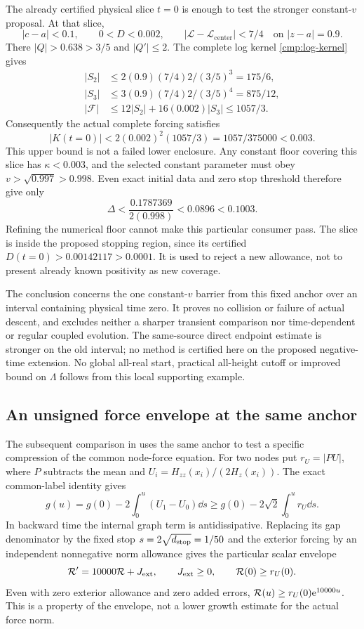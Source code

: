 The already certified physical slice $t=0$ is enough to test the stronger
constant-$v$ proposal. At that slice,
\[
 |c-a|<0.1,\qquad 0<D<0.002,\qquad
 |\mathcal L-\mathcal L_{\mathrm{center}}|<7/4
 \quad\text{on }|z-a|=0.9.
\]
There $|Q|>0.638>3/5$ and $|Q'|\le2$. The complete log kernel
\eqref{cmp:log-kernel} gives
\begin{align*}
 |S_2|&\le 2(0.9)(7/4)2/(3/5)^3=175/6,\\
 |S_3|&\le 3(0.9)(7/4)2/(3/5)^4=875/12,\\
 |\mathcal F|&\le12|S_2|+16(0.002)|S_3|\le1057/3.
\end{align*}
Consequently the actual complete forcing satisfies
\begin{equation}
 |K(t=0)|<2(0.002)^2(1057/3)
        =1057/375000<0.003.
 \label{supp:small-K}
\end{equation}
This upper bound is not a failed lower enclosure. Any constant floor
covering this slice has $\kappa<0.003$, and the selected constant
parameter must obey $v>\sqrt{0.997}>0.998$. Even exact initial data and
zero stop threshold therefore give only
\[
 \Delta<\frac{0.1787369}{2(0.998)}<0.0896<0.1003.
\]
Refining the numerical floor cannot make this particular consumer pass.
The slice is inside the proposed stopping region, since its certified
$D(t=0)>0.00142117>0.0001$. It is used to reject a new allowance, not to
present already known positivity as new coverage.

The conclusion concerns the one constant-$v$ barrier from this fixed
anchor over an interval containing physical time zero. It proves no
collision or failure of actual descent, and excludes neither a sharper
transient comparison nor time-dependent or regular coupled evolution.
The same-source direct endpoint estimate is stronger on the old interval;
no method is certified here on the proposed negative-time extension.
No global all-real start, practical all-height cutoff or improved bound
on $\Lambda$ follows from this local supporting example.

\subsection{An unsigned force envelope at the same anchor}
\label{supp:force-envelope}

The subsequent comparison in \cite{BakerCM32,BakerCMReview29} uses
the same anchor to test a specific compression of the common node-force
equation. For two nodes put $r_U=|PU|$, where $P$ subtracts the mean
and $U_i=H_{zz}(x_i)/(2H_z(x_i))$. The exact common-label identity gives
\[
 g(u)=g(0)-2\int_0^u(U_1-U_0)\dd s
       \ge g(0)-2\sqrt2\int_0^u r_U\dd s.
\]
In backward time the internal graph term is antidissipative. Replacing
its gap denominator by the fixed stop
$s=2\sqrt{d_{\rm stop}}=1/50$ and the exterior forcing by an
independent nonnegative norm allowance gives the particular scalar
envelope
\[
 \mathcal R'=10000\mathcal R+J_{\rm ext},\qquad
 J_{\rm ext}\ge0,\qquad \mathcal R(0)\ge r_U(0).
\]
Even with zero exterior allowance and zero added errors,
$\mathcal R(u)\ge r_U(0)\mathrm e^{10000u}$.
This is a property of the envelope, not a lower growth estimate for
the actual force norm.


